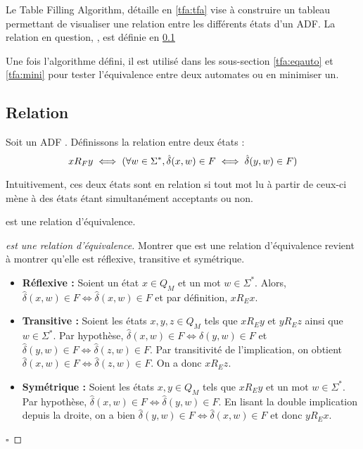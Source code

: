 Le Table Filling Algorithm, détaille en \ref{tfa:tfa} vise à construire un tableau permettant de visualiser une relation entre les différents états d'un ADF. La relation en question, \rf, est définie en \ref{tfa:re}

Une fois l'algorithme défini, il est utilisé dans les sous-section \ref{tfa:eqauto} et \ref{tfa:mini} pour tester l'équivalence entre deux automates ou en minimiser un.





\subsection{Relation \rf}\label{tfa:re}

Soit un ADF \automaton. Définissons la relation \rf entre deux états :
$$xR_Fy \iff (\forall w \in \Sigma^*,\hat{\delta}(x,w) \in F \iff \hat{\delta}(y,w) \in F)$$

Intuitivement, ces deux états sont en relation si tout mot lu à partir de ceux-ci mène à des états étant simultanément acceptants ou non.

\begin{proposition}[\rf]
 \rf est une relation d'équivalence.
\end{proposition}

\begin{proof}[\rf est une relation d'équivalence] Montrer que \rf est une relation d'équivalence revient à montrer qu'elle est réflexive, transitive et symétrique.
 \begin{itemize}
	 \item \textbf{Réflexive :} Soient un état $x \in Q_M$ et un mot $w \in \Sigma^*$. Alors, $\hat{\delta}(x,w) \in F \iff \hat{\delta}(x,w) \in F$ et par définition, $xR_Ex$.
	 \item \textbf{Transitive :} Soient les états $x,y,z \in Q_M$ tels que $xR_Ey$ et $yR_Ez$ ainsi que $w \in \Sigma^*$. Par hypothèse, $\hat{\delta}(x,w) \in F \iff \hat{\delta}(y,w)\in F$ et $\hat{\delta}(y,w) \in F\iff \hat{\delta}(z,w) \in F$. Par transitivité de l'implication, on obtient $\hat{\delta}(x,w) \in F \iff \hat{\delta}(z,w)\in F$. On a donc $xR_Ez$.
	 \item \textbf{Symétrique : } Soient les états $x,y \in Q_M$ tels que $xR_Ey$ et un mot $w \in \Sigma^*$. Par hypothèse, $\hat{\delta}(x, w)\in F \iff \hat{\delta}(y, w)\in F$. En lisant la double implication depuis la droite, on a bien $\hat{\delta}(y, w) \in F\iff \hat{\delta}(x, w)\in F$ et donc $yR_Ex$.
 \end{itemize}
 \hfill$\square$
\end{proof}

